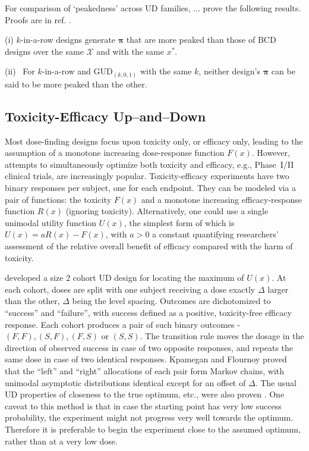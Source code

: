 For comparison of `peakedness' across UD families, ... prove the following results. Proofs are in ref. \cite{Oron:Hoff:thek:2009}.

\begin{thm}\label{thm:peak} (i) $k$-in-a-row designs generate $\boldsymbol{\pi}$ that are more peaked than those of BCD designs over the same $\mathcal{X}$ and with the same $x^*$.

\noindent (ii) \ For $k$-in-a-row and GUD$_{(k,0,1)}$ with the same $k$, neither design's $\boldsymbol{\pi}$ can be said to be more peaked than the other.
\end{thm}

\subsection{Toxicity-Efficacy Up--and--Down}

Most dose-finding designs focus upon toxicity only, or efficacy only, leading to the assumption of a monotone increasing dose-response function $F(x)$. However, attempts to simultaneously optimize both toxicity and efficacy, e.g., Phase~I/II clinical trials, are increasingly popular. Toxicity-efficacy experiments have two binary responses per subject, one for each endpoint. They can be modeled via a pair of functions: the toxicity $F(x)$ and a monotone increasing efficacy-response function $R(x)$ (ignoring toxicity). Alternatively, one could use a single unimodal utility function $U(x)$, the simplest form of which is $U(x)=aR(x)-F(x)$, with $a>0$ a constant quantifying researchers' assessment of the relative overall benefit of efficacy compared with the harm of toxicity.

\cite{Kpam:Flou:opti:2001} developed a size $2$ cohort UD design for locating the maximum of $U(x)$. At each cohort, doses are split with one subject receiving a dose  exactly $\Delta$ larger than the other, $\Delta$ being the level spacing. Outcomes are dichotomized to ``success'' and ``failure'', with success defined as a positive, toxicity-free efficacy response. Each cohort produces a pair of such binary outcomes - $(F,F),(S,F),(F,S)$ or $(S,S)$. The transition rule moves the dosage in the direction of observed success in case of two opposite responses, and repeats the same dose in case of two identical responses. Kpamegan and Flournoy proved that the ``left'' and ``right'' allocations of each pair form Markov chains, with unimodal asymptotic distributions identical except for an offset of $\Delta$. The usual UD properties of closeness to the true optimum, etc., were also proven \citep{Kpam:Flou:opti:2008}. One caveat to this method is that in case the starting point has very low success probability, the experiment might not progress very well towards the optimum. Therefore it is preferable to begin the experiment close to the assumed optimum, rather than at a very low dose.

